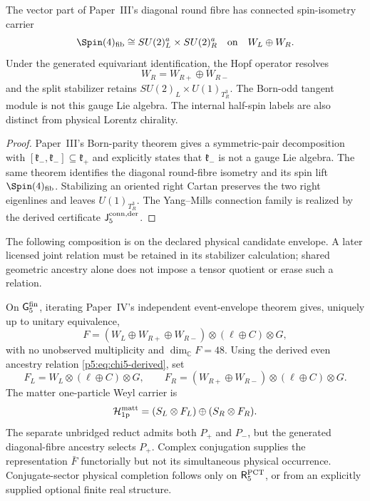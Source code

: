 \documentclass[12pt,a4paper]{article}
\begin{document}
\begin{lemma}
\label{p5:lem:protected-chirality-right-hopf-split}
The vector part of Paper~III's diagonal round fibre has connected spin-isometry
carrier
\[
\Spin(4)_{\rm fib}\cong SU(2)^a_L\times SU(2)^a_R
\quad\text{on}\quad
W_L\oplus W_R.
\]
Under the generated equivariant identification, the Hopf
operator resolves
\[
W_R=W_{R+}\oplus W_{R-}
\]
and the split stabilizer retains
\(SU(2)_L\times U(1)_{T_R^3}\).  The Born-odd tangent module is not this gauge
Lie algebra.  The internal half-spin labels are also distinct from physical
Lorentz chirality.
\end{lemma}

\begin{proof}
Paper~III's Born-parity theorem gives a symmetric-pair decomposition with
\([\mathfrak k_-,\mathfrak k_-]\subseteq\mathfrak k_+\) and explicitly states
that \(\mathfrak k_-\) is not a gauge Lie algebra.  The same theorem identifies
the diagonal round-fibre isometry and its spin lift
\(\Spin(4)_{\rm fib}\).  Stabilizing an oriented right Cartan preserves the two
right eigenlines and leaves \(U(1)_{T_R^3}\).  The Yang--Mills connection
family is realized by the derived certificate
\(\mathsf J_5^{\rm conn,der}\).
\end{proof}

\begin{theorem}
\label{p5:thm:component-independence-composition}
The following composition is on the declared physical candidate envelope. A later licensed joint relation must be retained in its stabilizer calculation; shared geometric ancestry alone does not impose a tensor quotient or erase such a relation.

On \(\mathsf G_5^{\rm fin}\), iterating Paper~IV's
independent event-envelope theorem gives, uniquely up to unitary equivalence,
\begin{equation}
\label{p5:eq:componentwise-joint-carrier}
F
=
(W_L\oplus W_{R+}\oplus W_{R-})
\otimes(\ell\oplus C)
\otimes G,
\end{equation}
with no unobserved multiplicity and \(\dim_\mathbb C F=48\).  Using the
derived even ancestry relation \eqref{p5:eq:chi5-derived}, set
\[
F_L=W_L\otimes(\ell\oplus C)\otimes G,
\qquad
F_R=(W_{R+}\oplus W_{R-})\otimes(\ell\oplus C)\otimes G.
\]
The matter one-particle Weyl carrier is
\begin{equation}
\label{p5:eq:physical-one-particle-factorization}
\mathcal H_{\rm 1p}^{\rm matt}
=(S_L\otimes F_L)\oplus(S_R\otimes F_R).
\end{equation}
The separate unbridged reduct admits both \(P_+\) and \(P_-\), but the
generated diagonal-fibre ancestry selects \(P_+\).  Complex conjugation supplies the representation
\(\bar F\) functorially but not its simultaneous physical occurrence.
Conjugate-sector physical completion follows only on
\(\mathsf R_5^{\rm PCT}\), or from an explicitly supplied optional finite real
structure.
\end{theorem}
\end{document}
